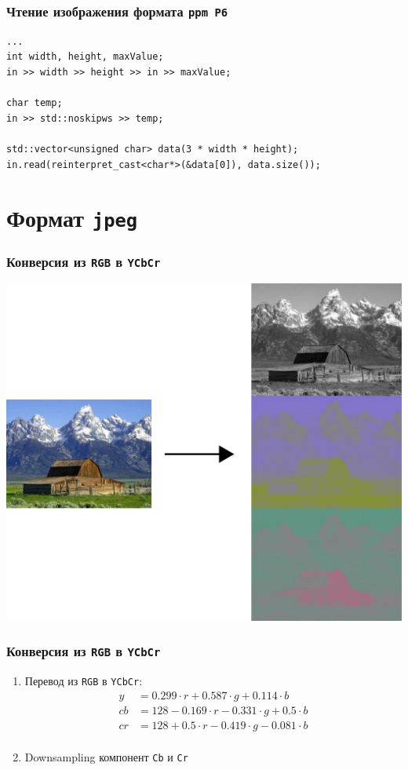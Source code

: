 \documentclass[10pt,pdf,hyperref={unicode}]{beamer}
\begin{document}
\begin{frame}[fragile]
\frametitle{Чтение изображения формата \texttt{ppm P6} } 
\begin{lstlisting}
...
int width, height, maxValue;
in >> width >> height >> in >> maxValue;

char temp;
in >> std::noskipws >> temp;

std::vector<unsigned char> data(3 * width * height);
in.read(reinterpret_cast<char*>(&data[0]), data.size());
\end{lstlisting}
\end{frame}

\section{Формат \texttt{jpeg}}

\begin{frame}[fragile]
\frametitle{Конверсия из \texttt{RGB} в \texttt{YCbCr}} 
\begin{center}
\includegraphics[scale=0.4]{./images/rgb_to_ycbcr.png}
\end{center}
\end{frame}

\begin{frame}[fragile]
\frametitle{Конверсия из \texttt{RGB} в \texttt{YCbCr}}

\begin{enumerate}
\item Перевод из \texttt{RGB} в \texttt{YCbCr}:
\begin{align*}
y  &= 0.299 \cdot r + 0.587 \cdot g + 0.114 \cdot b \\
cb &= 128 - 0.169 \cdot r - 0.331 \cdot g + 0.5 \cdot b \\
cr &= 128 + 0.5 \cdot r - 0.419 \cdot g - 0.081 \cdot b \\
\end{align*}

\item Downsampling компонент \texttt{Cb} и \texttt{Cr}
\end{enumerate}

\end{frame}
\end{document}
